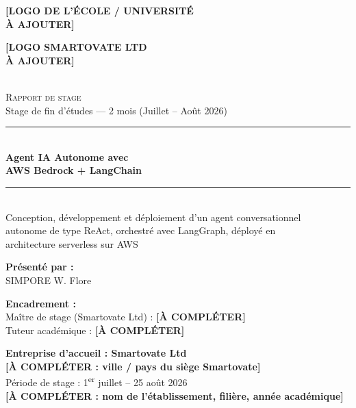 \documentclass[11pt,a4paper]{report}
\begin{document}
\begin{titlepage}
\centering
\vspace*{0.5cm}

{\large
\begin{minipage}[t]{0.48\linewidth}
\textbf{[LOGO DE L'ÉCOLE / UNIVERSITÉ\\ À AJOUTER]}
\end{minipage}
\hfill
\begin{minipage}[t]{0.48\linewidth}
\raggedleft
\textbf{[LOGO SMARTOVATE LTD\\ À AJOUTER]}
\end{minipage}
}\\[2cm]

{\Large \textsc{Rapport de stage}}\\[0.3cm]
{\large Stage de fin d'études — 2 mois (Juillet -- Août 2026)}\\[1.5cm]

\rule{\linewidth}{0.6pt}\\[0.5cm]
{\huge \textbf{Agent IA Autonome avec}}\\[0.2cm]
{\huge \textbf{AWS Bedrock + LangChain}}\\[0.5cm]
\rule{\linewidth}{0.6pt}\\[1.2cm]

{\large Conception, développement et déploiement d'un agent conversationnel\\
autonome de type ReAct, orchestré avec LangGraph, déployé en\\
architecture serverless sur AWS}\\[2cm]

\begin{minipage}{0.45\textwidth}
\textbf{Présenté par :}\\
SIMPORE W. Flore
\end{minipage}
\hfill
\begin{minipage}{0.45\textwidth}
\raggedleft
\textbf{Encadrement :}\\
Maître de stage (Smartovate Ltd) : \textbf{[À COMPLÉTER]}\\
Tuteur académique : \textbf{[À COMPLÉTER]}
\end{minipage}

\vfill

\begin{center}
\textbf{Entreprise d'accueil : Smartovate Ltd}\\
\textbf{[À COMPLÉTER : ville / pays du siège Smartovate]}\\[0.3cm]
Période de stage : 1\textsuperscript{er} juillet -- 25 août 2026\\[0.3cm]
\textbf{[À COMPLÉTER : nom de l'établissement, filière, année académique]}
\end{center}

\vspace{1cm}
\end{titlepage}
\end{document}
